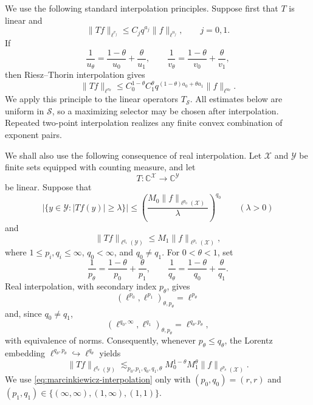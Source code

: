 \documentclass[11pt,letterpaper]{amsart}
\numberwithin{equation}{section}
\theoremstyle{definition}
\theoremstyle{remark}
\newcommand{\norm}[1]{\lVert #1\rVert}
\begin{document}
We use the following standard interpolation principles. Suppose first that $T$ is linear and
\[
 \norm{Tf}_{\ell^{v_j}}
 \leq C_jq^{a_j}\norm{f}_{\ell^{u_j}},
 \qquad j=0,1.
\]
If
\[
 \frac1{u_\theta}=\frac{1-\theta}{u_0}+\frac\theta{u_1},
 \qquad
 \frac1{v_\theta}=\frac{1-\theta}{v_0}+\frac\theta{v_1},
\]
then Riesz--Thorin interpolation gives
\[
 \norm{Tf}_{\ell^{v_\theta}}
 \leq C_0^{1-\theta}C_1^\theta
 q^{(1-\theta)a_0+\theta a_1}
 \norm{f}_{\ell^{u_\theta}}.
\]
We apply this principle to the linear operators $T_{\mathcal S}$.  All estimates below are uniform in $\mathcal S$, so a maximizing selector may be chosen after interpolation. Repeated two-point interpolation realizes any finite convex combination of exponent pairs.


We shall also use the following consequence of real interpolation.
Let $\mathcal X$ and $\mathcal Y$ be finite sets equipped with counting
measure, and let
\[
 T:\mathbb C^{\mathcal X}\longrightarrow\mathbb C^{\mathcal Y}
\]
be linear. Suppose that
\begin{equation}\label{eq:distributional-interpolation-endpoint}
 \bigl|\{y\in\mathcal Y:|Tf(y)|\geq\lambda\}\bigr|
 \leq
 \left(
   \frac{M_0\norm{f}_{\ell^{p_0}(\mathcal X)}}{\lambda}
 \right)^{q_0}
 \qquad(\lambda>0)
\end{equation}
and
\begin{equation}\label{eq:strong-interpolation-endpoint}
 \norm{Tf}_{\ell^{q_1}(\mathcal Y)}
 \leq
 M_1\norm{f}_{\ell^{p_1}(\mathcal X)},
\end{equation}
where $1\leq p_i,q_i\leq\infty$, $q_0<\infty$, and
$q_0\neq q_1$. For $0<\theta<1$, set
\[
 \frac1{p_\theta}
 =
 \frac{1-\theta}{p_0}+\frac\theta{p_1},
 \qquad
 \frac1{q_\theta}
 =
 \frac{1-\theta}{q_0}+\frac\theta{q_1}.
\]
Real interpolation, with secondary index $p_\theta$, gives
\[
 (\ell^{p_0},\ell^{p_1})_{\theta,p_\theta}
 =\ell^{p_\theta}
\]
and, since $q_0\neq q_1$,
\[
 (\ell^{q_0,\infty},\ell^{q_1})_{\theta,p_\theta}
 =\ell^{q_\theta,p_\theta},
\]
with equivalence of norms. Consequently, whenever
$p_\theta\leq q_\theta$, the Lorentz embedding
$\ell^{q_\theta,p_\theta}\hookrightarrow\ell^{q_\theta}$ yields
\begin{equation}\label{eq:marcinkiewicz-interpolation}
 \norm{Tf}_{\ell^{q_\theta}(\mathcal Y)}
 \lesssim_{p_0,p_1,q_0,q_1,\theta}
 M_0^{1-\theta}M_1^\theta
 \norm{f}_{\ell^{p_\theta}(\mathcal X)}.
\end{equation}
We use \eqref{eq:marcinkiewicz-interpolation} only with
$(p_0,q_0)=(r,r)$ and $(p_1,q_1)\in\{(\infty,\infty),(1,\infty),(1,1)\}$.
\end{document}
